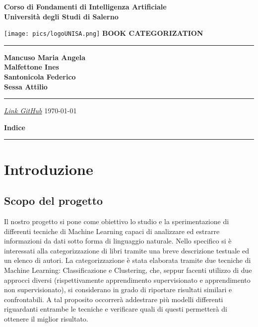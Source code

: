 \documentclass[12pt,oneside]{article}
\begin{document}
\begin{titlepage}
    \begin{flushright}
        \textbf{Corso di Fondamenti di Intelligenza Artificiale}
        \textbf{\\Università degli Studi di Salerno}
    \end{flushright}
    \vspace*{1.5cm}
    \centering
    \texttt{[image: pics/logoUNISA.png]}
    \vfill
    \Huge\textbf{BOOK CATEGORIZATION}
    \vspace{1ex}
    \rule{\linewidth}{1pt}
    \Large\textbf{Mancuso Maria Angela \\
        Malfettone Ines \\
        Santonicola Federico  \\
        Sessa Attilio \\
        }
    \rule{\linewidth}{1pt}
    \vspace{2cm}
    \hfill
    \textit{\href{https://github.com/fedesanto/ProgettoFIA}{Link GitHub}}
    \hfill
    \vfill
    \today
\end{titlepage}

\clearpage %

\setcounter{page}{1}

\begin{flushright}
        \Large\textbf{Indice}
\end{flushright}
\rule{\linewidth}{1pt}

\renewcommand{\contentsname}{}
\tableofcontents

\clearpage
\setcounter{section}{0}
\section{Introduzione}
    \begin{enumerate}
    \subsection{Scopo del progetto}
    \begin{justify}

        Il nostro progetto si pone come obiettivo lo studio e la sperimentazione di differenti tecniche di Machine Learning capaci di analizzare ed estrarre informazioni da dati sotto forma di linguaggio naturale. Nello specifico si è interessati alla categorizzazione di libri tramite una breve descrizione testuale ed un elenco di autori. La categorizzazione è stata elaborata tramite due tecniche di Machine Learning: Classificazione e Clustering, che, seppur facenti utilizzo di due approcci diversi (rispettivamente apprendimento supervisionato e apprendimento non supervisionato), si considerano in grado di riportare risultati similari e confrontabili. A tal proposito occorrerà addestrare più modelli differenti riguardanti entrambe le tecniche e verificare quali di questi permetterà di ottenere il miglior risultato.

    \end{justify}
    \end{enumerate}
\end{document}
